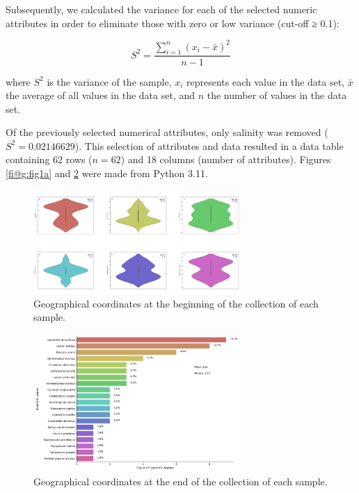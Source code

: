 Subsequently, we calculated the variance for each of the selected numeric attributes in order to eliminate those with zero or low variance (cut-off ≥ 0.1):

\begin{equation}
S^2 = \frac{\sum_{i=1}^{n} (x_i - \bar{x})^2}{n-1}
\end{equation}

where \( S^2 \) is the variance of the sample, \( x_i \) represents each value in the data set, \( \bar{x} \) the average of all values in the data set, and \( n \) the number of values in the data set.

Of the previously selected numerical attributes, only salinity was removed (\( S^2 = 0.02146629 \)). This selection of attributes and data resulted in a data table containing 62 rows (\( n=62 \)) and 18 columns (number of attributes). Figures \ref{fi@g:fig1a} and \ref{fig:fig1b} were made from Python 3.11.

\begin{figure}[]
    \centering
    \includegraphics[width=0.7\textwidth]{figure1.jpg}
    \caption{Geographical coordinates at the beginning of the collection of each sample. \label{fig:fig1a}}
\end{figure}

\begin{figure}[]
    \centering
    \includegraphics[width=0.7\textwidth]{figure2.jpg}
    \caption{Geographical coordinates at the end of the collection of each sample. \label{fig:fig1b}}
\end{figure}

